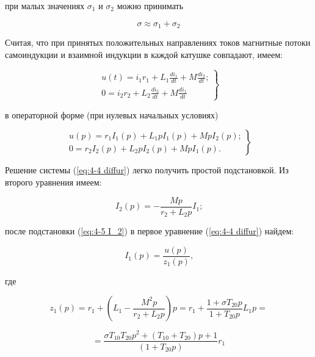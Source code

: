 при малых значениях $ \sigma_1 $ и $ \sigma_2 $ можно принимать

\begin{equation}
    \sigma \approx \sigma_1 + \sigma_2
	\label{eq:4-2 sigma}
\end{equation}

Считая, что при принятых положительных направлениях токов магнитные потоки самоиндукции и взаимной индукции в каждой катушке совпадают, имеем:

\begin{equation}
    \left.\begin{matrix}
        u(t) = i_1 r_1 + L_1 \frac{di_1}{dt} + M \frac{di_2}{dt}\text{;}\\ 
        0 = i_2 r_2 + L_2 \frac{di_2}{dt} + M \frac{di_1}{dt}
    \end{matrix}\right\}
	\label{eq:4-3 diffur}
\end{equation}

в операторной форме (при нулевых начальных условиях)

\begin{equation}
    \left.\begin{matrix}
        u(p) = r_1 I_1(p) + L_1 p I_1(p) + M p I_2(p) \text{;}\\ 
        0 = r_2 I_2(p) + L_2 p I_2(p) + M p I_1(p) \text{.}
    \end{matrix}\right\}
	\label{eq:4-4 diffur}
\end{equation}

Решение системы (\ref{eq:4-4 diffur}) легко получить простой подстановкой. Из второго уравнения имеем:

\begin{equation}
    I_2(p) = - \frac{M p}{r_2 + L_2 p} I_1 \text{;}
	\label{eq:4-5 I_2}
\end{equation}

после подстановки (\ref{eq:4-5 I_2}) в первое уравнение (\ref{eq:4-4 diffur}) найдем:

\begin{equation}
    I_1(p) = \frac{u(p)}{z_1(p)} \text{,}
	\label{eq:4-6 I_1}
\end{equation}

где

\begin{equation*}
    z_1(p) = r_1 + (L_1 - \frac{M^2 p}{r_2 + L_2 p}) p = r_1 + \frac{1 + \sigma T_{20} p}{1+T_{20} p} L_1 p =
\end{equation*}

\begin{equation}
    = \frac{\sigma T_{10} T_{20} p^2 + (T_{10} + T_{20}) p + 1}{(1 + T_{20} p)} r_1
	\label{eq:4-7 z_1}
\end{equation}

